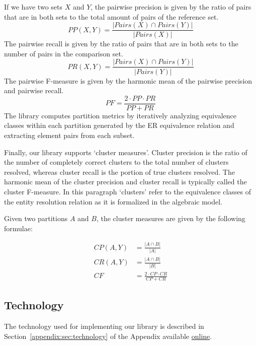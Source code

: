 \documentclass[a4paper,twoside]{article}
\newcommand{\appendixurl}{https://www.cs.ubbcluj.ro/~andrei.olar/article-data/er-metrics-library/02_appendix.pdf}
\begin{document}
    If we have two sets $X$ and $Y$, the pairwise precision is given by the
    ratio of pairs that are in both sets to the total amount of pairs of the
    reference set.
    \begin{equation}
        PP(X, Y) = \frac{|{Pairs(X)}\cap{Pairs(Y)}|}{|Pairs(X)|}
    \end{equation}    
    The pairwise recall is given by the ratio of pairs that are in both sets
    to the number of pairs in the comparison set\cite{hitesh2012}.
    \begin{equation}
        PR(X, Y) = \frac{|{Pairs(X)}\cap{Pairs(Y)}|}{|Pairs(Y)|}
    \end{equation}
    The pairwise F-measure is given by the harmonic mean of the pairwise
    precision and pairwise recall.
    \begin{equation}
        PF = \frac{2 \cdot PP \cdot PR}{PP + PR}
    \end{equation}
    The library computes partition metrics by iteratively analyzing equivalence
    classes within each partition generated by the ER equivalence relation and
    extracting element pairs from each subset.
    
    Finally, our library supports `cluster measures'\cite{hitesh2012}.
    Cluster precision is the ratio of the number of completely correct
    clusters to the total number of clusters resolved, whereas cluster recall
    is the portion of true clusters resolved\cite{huang2006efficient}.
    The harmonic mean of the cluster precision and cluster recall is typically
    called the cluster F-measure.
    In this paragraph `clusters' refer to the equivalence classes of the entity
    resolution relation as it is formalized in the algebraic model.
    
    Given two partitions $A$ and $B$, the cluster measures are given by the
    following formulae:

    \begin{align}
        CP(A, Y) &= \frac{|{A}\cap{B}|}{|A|}\\
        CR(A, Y) &= \frac{|{A}\cap{B}|}{|B|}\\
        CF &= \frac{2\cdot{CP}\cdot{CR}}{CP + CR}
    \end{align}

    \subsection{Technology}\label{sec:tech}

    The technology used for implementing our library is described in
    Section~\ref{appendix:sec:technology} of the Appendix available \href{\appendixurl}{online}.
    
\end{document}
